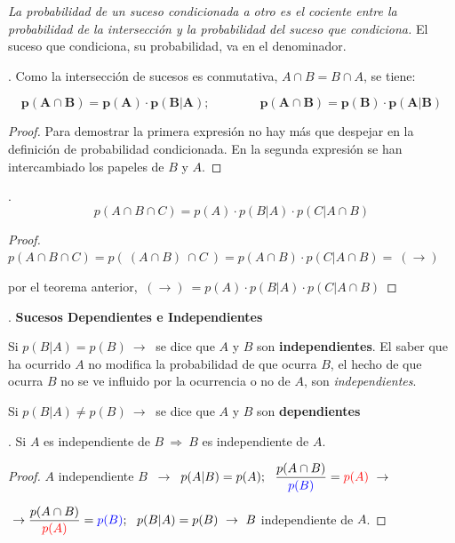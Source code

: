 \emph{La probabilidad de un suceso condicionada a otro es el cociente entre la probabilidad de la intersección y la probabilidad del suceso que condiciona.} \textcolor{gris}{El suceso que condiciona, su probabilidad, va en el denominador.}


\begin{theorem}
. Como la intersección de sucesos es conmutativa, $A\cap B=B\cap A$, se tiene:

$$	\boldsymbol{ p(A\cap B)=p(A)\cdot p(B|A); \qquad \qquad p(A\cap B)=p(B)\cdot p(A|B) } $$
\end{theorem}

\begin{proof}
	Para demostrar la primera expresión no hay más que despejar en la definición de probabilidad condicionada. En la segunda expresión se han intercambiado los papeles de $B$ y $A$.	
\end{proof}

\begin{theorem}
.	$$p(A\cap B\cap C)=p(A)\cdot p(B|A)\cdot p(C|A\cap B)$$	
\end{theorem}

\begin{proof}
$p(	A\cap B\cap C)=p(\ (A\cap B) \ \cap C\ )= p(A\cap B)\cdot p(C|A\cap B) =\ (\to) $

por el teorema anterior, $\ (\to) \ = p(A)\cdot p(B|A) \cdot p(C|A\cap B)$
\end{proof}


\begin{definition}
.	\textbf{Sucesos Dependientes e Independientes}	

\vspace{2mm} Si $p(B|A)=p(B)\ \to \ $ se dice que $A$ y $B$ son \textbf{independientes}. El saber que ha ocurrido $A$ no modifica la probabilidad de que ocurra $B$, el hecho de que ocurra $B$ no se ve influido por la ocurrencia o no de $A$, son \emph{independientes}. 

\vspace{2mm} Si $p(B|A) \neq p(B)\ \to \ $ se dice que $A$ y $B$ son \textbf{dependientes}
\end{definition}

\begin{theorem}
.	Si $A$ es independiente de $B \ \Rightarrow \ B$ es independiente de $A$. 	
\end{theorem}
\begin{proof}
$A$ independiente $B$ $\ \to \ $ $p(A|B)=p(A);\ \ \dfrac{p(A\cap B)}{\textcolor{blue}{p(B)} }= \textcolor{red}{p(A)} \ \to $

$\ \to  \dfrac{p(A\cap B)}{ \textcolor{red}{p(A)}} =  \textcolor{blue}{p(B)};\ \ p(B|A)=p(B) \ \to \ B$ independiente de $A$.	
\end{proof}



